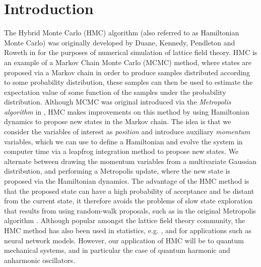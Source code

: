 \documentclass[12pt]{article}
\begin{document}
\section{Introduction}
 The Hybrid Monte Carlo (HMC) algorithm (also referred to as Hamiltonian Monte Carlo) was originally developed by Duane, Kennedy, Pendleton and Roweth in \cite{duane_kennedy_pendleton_roweth_1987} for the purposes of numerical simulation of lattice field theory. HMC is an example of a Markov Chain Monte Carlo (MCMC) method, where states are proposed via a Markov chain in order to produce samples distributed according to some probability distribution, these samples can then be used to estimate the expectation value of some function of the samples under the probability distribution. Although MCMC was original introduced via the \textit{Metropolis algorithm} in \cite{metropolis_rosenbluth_rosenbluth_teller_teller_1953}, HMC makes improvements on this method by using Hamiltonian dynamics to propose new states in the Markov chain. The idea is that we consider the variables of interest as \textit{position} and introduce auxiliary \textit{momentum} variables, which we can use to define a Hamiltonian and evolve the system in computer time via a leapfrog integration method to propose new states. We alternate between drawing the momentum variables from a multivariate Gaussian distribution, and performing a Metropolis update, where the new state is proposed via the Hamiltonian dynamics. The advantage of the HMC method is that the proposed state can have a high probability of acceptance and be distant from the current state, it therefore avoids the problems of slow state exploration that results from using random-walk proposals, such as in the original Metropolis algorithm \cite{neal_2011}. Although popular amongst the lattice field theory community, the HMC method has also been used in statistics, e.g. \cite{neal_1996_a}, \cite{ishwaran_1999} and \cite{schmidt_2009} for applications such as neural network models. However, our application of HMC will be to quantum mechanical systems, and in particular the case of quantum harmonic and anharmonic oscillators.
\end{document}
